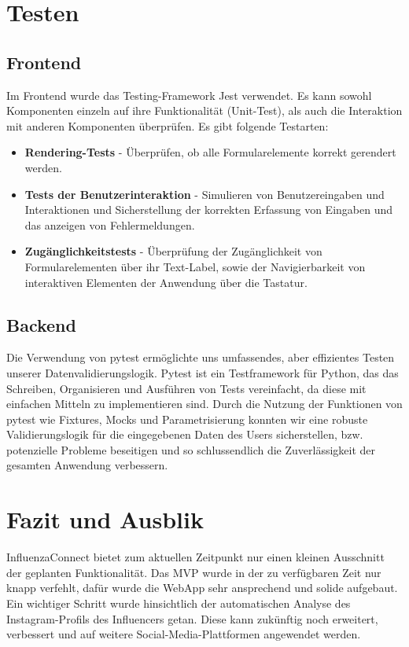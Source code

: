 \documentclass[conference,a4paper,flushend]{cs-techrep}
\begin{document}
\section{Testen}
\subsection{Frontend}
Im Frontend wurde das Testing-Framework Jest verwendet. Es kann sowohl Komponenten einzeln auf ihre Funktionalität (Unit-Test), als auch die Interaktion mit anderen Komponenten überprüfen. Es gibt folgende Testarten:

\begin{itemize}
	\item{\textbf{Rendering-Tests} - Überprüfen, ob alle Formularelemente korrekt gerendert werden.}
	\item{\textbf{Tests der Benutzerinteraktion} - Simulieren von Benutzereingaben und Interaktionen und Sicherstellung der korrekten Erfassung von Eingaben und das anzeigen von Fehlermeldungen.}
	\item{\textbf{Zugänglichkeitstests} - Überprüfung der Zugänglichkeit von Formularelementen über ihr Text-Label, sowie der Navigierbarkeit von interaktiven Elementen der Anwendung über die Tastatur.}
\end{itemize}


\subsection{Backend}
Die Verwendung von pytest ermöglichte uns umfassendes, aber effizientes Testen unserer Datenvalidierungslogik. Pytest ist ein Testframework für Python, das das Schreiben, Organisieren und Ausführen von Tests vereinfacht, da diese mit einfachen Mitteln zu implementieren sind. Durch die Nutzung der Funktionen von pytest wie Fixtures, Mocks und Parametrisierung konnten wir eine robuste Validierungslogik für die eingegebenen Daten des Users sicherstellen, bzw. potenzielle Probleme beseitigen und so schlussendlich die Zuverlässigkeit der gesamten Anwendung verbessern. 



\section{Fazit und Ausblik}
InfluenzaConnect bietet zum aktuellen Zeitpunkt nur einen kleinen Ausschnitt der geplanten Funktionalität. Das MVP wurde in der zu verfügbaren Zeit nur knapp verfehlt, dafür wurde die WebApp sehr ansprechend und solide aufgebaut. Ein wichtiger Schritt wurde hinsichtlich der automatischen Analyse des Instagram-Profils des Influencers getan. Diese kann zukünftig noch erweitert, verbessert und auf weitere Social-Media-Plattformen angewendet werden. 
\end{document}
